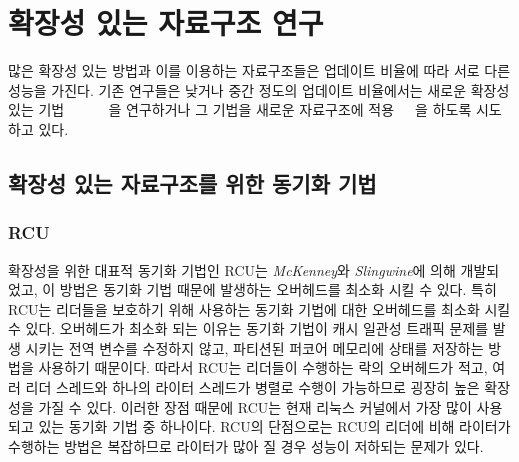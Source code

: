 \newpage
\section{확장성 있는 자료구조 연구}
\label{sec:datarelated}
많은 확장성 있는 방법과 이를 이용하는 자료구조들은 업데이트 비율에 따라 서로 다른 성능을 가진다.
기존 연구들은 낮거나 중간 정도의 업데이트 비율에서는 새로운 확장성있는
기법~\cite{McKenney98}~\cite{Matveev2015RLU}~\cite{Harris2001Lockfree} ~\cite{Fomitchev2004Lockfree}
~\cite{Timnat2012}을 연구하거나 그 기법을 새로운 자료구조에 
적용~\cite{Arbel2014ConcurrentRCU}~\cite{Dodds2015SCT}~\cite{AustinTClements2012RCUBalancedTrees}을
하도록 시도하고 있다.

\subsection{확장성 있는 자료구조를 위한 동기화 기법}

\subsubsection{RCU}
확장성을 위한 대표적 동기화 기법인 RCU는 \textit{McKenney}와 \textit{Slingwine}에 의해 개발되었고, 
이 방법은 동기화 기법 때문에 발생하는 오버헤드를 최소화 시킬 수 있다. 
특히 RCU는 리더들을 보호하기 위해 사용하는 동기화 기법에 대한 오버헤드를 최소화 시킬 수 있다. 
오버헤드가 최소화 되는 이유는 동기화 기법이 캐시 일관성 트래픽 문제를 발생 시키는 전역 변수를 수정하지 않고, 
파티션된 퍼코어 메모리에 상태를 저장하는 방법을 사용하기 때문이다.
따라서 RCU는 리더들이 수행하는 락의 오버헤드가 적고, 여러 리더 스레드와
하나의 라이터 스레드가 병렬로 수행이 가능하므로 굉장히 높은 확장성을 가질 수 있다.
이러한 장점 때문에 RCU는 현재 리눅스 커널에서 가장 많이 사용되고 있는 동기화 기법 중 하나이다. 
RCU의 단점으로는 RCU의 리더에 비해 라이터가 수행하는 방법은 복잡하므로 라이터가 많아 질 경우 
성능이 저하되는 문제가 있다. 

